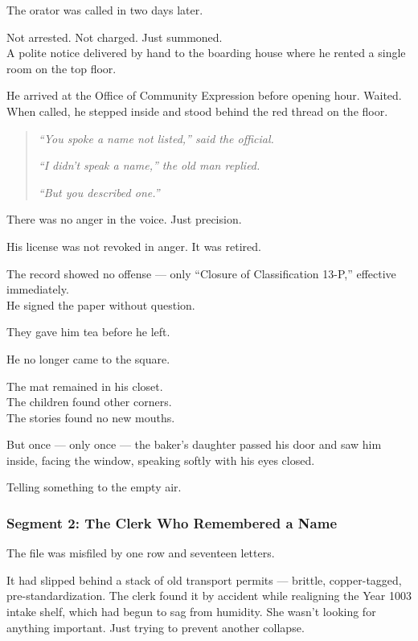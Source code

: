 \documentclass[9pt]{article}
\begin{document}
The orator was called in two days later.

Not arrested. Not charged. Just summoned.\\
A polite notice delivered by hand to the boarding house where he rented a single room on the top floor.

He arrived at the Office of Community Expression before opening hour. Waited. When called, he stepped inside and stood behind the red thread on the floor.

\begin{quote}
\textit{“You spoke a name not listed,” said the official.}

\textit{“I didn’t speak a name,” the old man replied.}

\textit{“But you described one.”}
\end{quote}

There was no anger in the voice. Just precision.

\vspace{1em}

His license was not revoked in anger. It was retired.

The record showed no offense --- only ``Closure of Classification 13-P,'' effective immediately.\\
He signed the paper without question.

They gave him tea before he left.

\vspace{1em}

He no longer came to the square.

The mat remained in his closet.\\
The children found other corners.\\
The stories found no new mouths.

But once --- only once --- the baker’s daughter passed his door and saw him inside, facing the window, speaking softly with his eyes closed.

Telling something to the empty air.

\newpage

\subsubsection*{Segment 2: The Clerk Who Remembered a Name}

The file was misfiled by one row and seventeen letters.

It had slipped behind a stack of old transport permits --- brittle, copper-tagged, pre-standardization. The clerk found it by accident while realigning the Year 1003 intake shelf, which had begun to sag from humidity. She wasn’t looking for anything important. Just trying to prevent another collapse.
\end{document}
